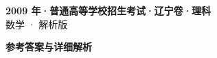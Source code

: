 \documentclass[zihao=-4, a4paper]{ctexart}
\begin{document}
\begin{center}
  {\Large\bfseries 2009 年·普通高等学校招生考试·辽宁卷·理科}\\[4pt]
  {\large 数学 · 解析版}
\end{center}
\medskip
{}

\clearpage
{}
\begin{center}{\Large\bfseries 参考答案与详细解析}\end{center}
\medskip

\end{document}
